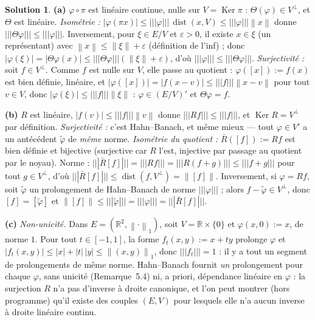 \documentclass[11pt,a4paper]{article}
\newcommand{\R}{\mathbb{R}}
\newcommand{\dist}{\operatorname{dist}}
\newcommand{\norm}[1]{\left\|#1\right\|}
\newcommand{\opnorm}[1]{|\!|\!|#1|\!|\!|}
\DeclareMathOperator{\Ker}{Ker}
\theoremstyle{definition}
\newtheorem*{solution}{Solution}
\begin{document}
\begin{solution}
\noindent\textbf{(a)} $\varphi\circ\pi$ est linéaire continue, nulle sur $V=\Ker\pi$ : $\Theta(\varphi)\in V^\perp$, et $\Theta$ est linéaire. \emph{Isométrie :} $|\varphi(\pi x)|\le\opnorm\varphi\,\dist(x,V)\le\opnorm\varphi\norm x$ donne $\opnorm{\Theta\varphi}\le\opnorm\varphi$. Inversement, pour $\xi\in E/V$ et $\varepsilon>0$, il existe $x\in\xi$ (un représentant) avec $\norm x\le\norm\xi+\varepsilon$ (définition de l'inf) ; donc $|\varphi(\xi)|=|\Theta\varphi(x)|\le\opnorm{\Theta\varphi}(\norm\xi+\varepsilon)$, d'où $\opnorm\varphi\le\opnorm{\Theta\varphi}$. \emph{Surjectivité :} soit $f\in V^\perp$. Comme $f$ est nulle sur $V$, elle passe au quotient : $\varphi([x]):=f(x)$ est bien définie, linéaire, et $|\varphi([x])|=|f(x-v)|\le\opnorm f\norm{x-v}$ pour tout $v\in V$, donc $|\varphi(\xi)|\le\opnorm f\norm\xi$ : $\varphi\in(E/V)'$ et $\Theta\varphi=f$.

\medskip
\noindent\textbf{(b)} $R$ est linéaire, $|f(v)|\le\opnorm f\norm v$ donne $\opnorm{Rf}\le\opnorm f$, et $\Ker R=V^\perp$ par définition. \emph{Surjectivité :} c'est Hahn--Banach, et même mieux — tout $\varphi\in V'$ a un antécédent $\tilde\varphi$ de \emph{même} norme. \emph{Isométrie du quotient :} $\bar R([f]):=Rf$ est bien définie et bijective (surjective car $R$ l'est, injective par passage au quotient par le noyau). Norme : $\opnorm{\bar R[f]}=\opnorm{Rf}=\opnorm{R(f+g)}\le\opnorm{f+g}$ pour tout $g\in V^\perp$, d'où $\opnorm{\bar R[f]}\le\dist(f,V^\perp)=\norm{[f]}$. Inversement, si $\varphi=Rf$, soit $\tilde\varphi$ un prolongement de Hahn--Banach de norme $\opnorm\varphi$ ; alors $f-\tilde\varphi\in V^\perp$, donc $[f]=[\tilde\varphi]$ et $\norm{[f]}\le\opnorm{\tilde\varphi}=\opnorm\varphi=\opnorm{\bar R[f]}$.

\medskip
\noindent\textbf{(c)} \emph{Non-unicité.} Dans $E=(\R^2,\norm\cdot_1)$, soit $V=\R\times\{0\}$ et $\varphi(x,0):=x$, de norme $1$. Pour tout $t\in[-1,1]$, la forme $f_t(x,y):=x+ty$ prolonge $\varphi$ et $|f_t(x,y)|\le|x|+|t|\,|y|\le\norm{(x,y)}_1$, donc $\opnorm{f_t}=1$ : il y a tout un segment de prolongements de même norme. Hahn--Banach fournit \emph{un} prolongement pour chaque $\varphi$, sans unicité (Remarque~5.4) ni, a priori, dépendance linéaire en $\varphi$ : la surjection $R$ n'a pas d'inverse à droite canonique, et l'on peut montrer (hors programme) qu'il existe des couples $(E,V)$ pour lesquels elle n'a aucun inverse à droite linéaire continu.


\end{solution}
\end{document}
